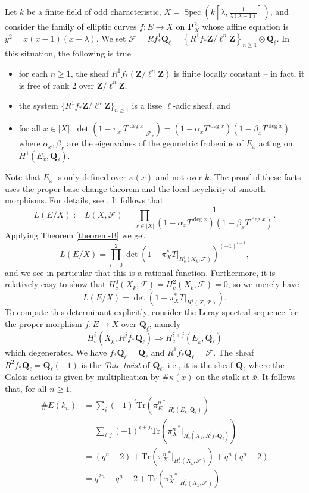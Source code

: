 \documentclass{stacks-project}
\theoremstyle{plain}
\theoremstyle{definition}
\theoremstyle{remark}
\numberwithin{equation}{subsection}
\def\Spec{\mathop{\mathrm{Spec}}}
\begin{document}
\noindent
Let $k$ be a finite field of odd characteristic,
$X = \Spec(k[\lambda, \frac{1}{\lambda(\lambda - 1)}])$, and
consider the family of elliptic
curves $f : E \to X$ on $\mathbf{P}^2_X$ whose affine equation is $y^2 =
x(x - 1)(x - \lambda)$. We set $\mathcal{F} = Rf_*^1\mathbf{Q}_\ell =
\left\{R^1f_*\mathbf{Z}/\ell^n\mathbf{Z}\right\}_{n\geq 1} \otimes
\mathbf{Q}_\ell$. In this situation, the following is true
\begin{itemize}
\item for each $n \geq 1$, the sheaf $R^1f_*(\mathbf{Z}/\ell^n\mathbf{Z})$ is
finite locally constant -- in fact, it is free of rank 2 over
$\mathbf{Z}/\ell^n\mathbf{Z}$,
\item the system $\{R^1f_*\mathbf{Z}/\ell^n\mathbf{Z}\}_{n\geq 1}$ is a lisse
$\ell$-adic sheaf, and
\item for all $x\in |X|$,
$\det(1 - \pi_x\ T^{\deg x} |_{\mathcal{F}_{\bar x}}) =
(1 - \alpha_x T^{\deg x})(1 - \beta_x T^{\deg x})$
where $\alpha_x, \beta_x$ are the eigenvalues of the geometric
frobenius of $E_x$ acting on $H^1(E_{\bar x}, \mathbf{Q}_\ell)$.
\end{itemize}
Note that $E_x$ is only defined over $\kappa(x)$ and not over $k$. The proof of
these facts uses the proper base change theorem and the local acyclicity of
smooth morphisms. For details, see \cite{SGA4.5}. It follows that
$$
L(E/X) := L(X, \mathcal{F}) = \prod_{x\in |X|}
\frac{1}{(1-\alpha_xT^{\deg x})(1-\beta_xT^{\deg x })} .
$$
Applying Theorem \ref{theorem-B} we get
$$
L(E/X) =
\prod_{i = 0}^2
\det\left(1 - \pi_X^*T |_{H_c^i(X_{\bar k}, \mathcal{F})}\right)^{(-1)^{i+1}},
$$
and we see in particular that this is a rational function. Furthermore, it is
relatively easy to show that $H_c^0(X_{\bar k}, \mathcal{F}) = H_c^2(X_{\bar
k}, \mathcal{F}) = 0$, so we merely have
$$
L(E/X) = \det(1 - \pi_X^*T |_{H_c^1(X, \mathcal{F})}).
$$
To compute this determinant explicitly, consider the Leray spectral sequence
for the proper morphism $f : E \to X$ over $\mathbf{Q}_\ell$, namely
$$
H_c^i(X_{\bar k}, R^jf_*\mathbf{Q}_\ell) \Rightarrow H_c^{i+j}(E_{\bar
k}, \mathbf{Q}_\ell)
$$
which degenerates. We have $f_*\mathbf{Q}_\ell = \mathbf{Q}_\ell$ and
$R^1f_*\mathbf{Q}_\ell = \mathcal{F}$. The sheaf $R^2f_*\mathbf{Q}_\ell =
\mathbf{Q}_\ell(-1)$ is the {\it Tate twist} of $\mathbf{Q}_\ell$, i.e.,
it is the sheaf $\mathbf{Q}_\ell$ where the Galois action is given by
multiplication by $\#\kappa(x)$ on the stalk at $\bar x$. It follows that,
for all $n\geq 1$,
\begin{align*}
\# E(k_n)
& =
\sum\nolimits_i (-1)^i
\text{Tr}({\pi_E^n}^* |_{H_c^i(E_{\bar k}, \mathbf{Q}_\ell)}) \\
& =
\sum\nolimits_{i, j} (-1)^{i+j}
\text{Tr}({\pi^n_X}^* |_{H_c^i(X_{\bar k}, R^jf_*\mathbf{Q}_\ell)}) \\
& =
(q^n - 2) +
\text{Tr}({\pi_X^n}^* |_{H_c^1(X_{\bar k}, \mathcal{F})}) + q^n(q^n - 2) \\
& =
q^{2n} - q^n - 2 +
\text{Tr}({\pi_X^n}^* |_{H_c^1(X_{\bar k}, \mathcal{F})})
\end{align*}
\end{document}
